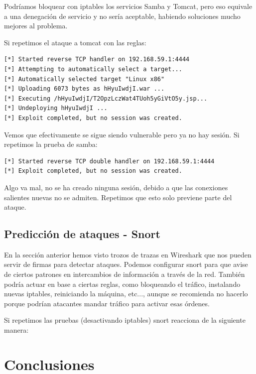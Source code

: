 \documentclass[a4paper,12pt]{scrartcl}
\begin{document}
\vspace{10pt}

Podríamos bloquear con iptables los servicios Samba y Tomcat, pero eso equivale a una denegación de servicio y no sería aceptable, habiendo soluciones mucho mejores al problema.

\vspace{10pt}

\noindent Si repetimos el ataque a tomcat con las reglas:

\begin{verbatim}
[*] Started reverse TCP handler on 192.168.59.1:4444 
[*] Attempting to automatically select a target...
[*] Automatically selected target "Linux x86"
[*] Uploading 6073 bytes as hHyuIwdjI.war ...
[*] Executing /hHyuIwdjI/T2OpzLczWat4TUoh5yGiVtO5y.jsp...
[*] Undeploying hHyuIwdjI ...
[*] Exploit completed, but no session was created.
\end{verbatim}

\noindent Vemos que efectivamente se sigue siendo vulnerable pero ya no hay sesión. Si repetimos la prueba de samba:

\begin{verbatim}
[*] Started reverse TCP double handler on 192.168.59.1:4444 
[*] Exploit completed, but no session was created.
\end{verbatim}

Algo va mal, no se ha creado ninguna sesión, debido a que las conexiones salientes nuevas no se admiten. Repetimos que esto solo previene parte del ataque.

\subsection{Predicción de ataques - Snort}



En la sección anterior hemos visto trozos de trazas en Wireshark que nos pueden servir de firmas para detectar ataques. Podemos configurar snort para que avise de ciertos patrones en intercambios de información a través de la red. También podría actuar en base a ciertas reglas, como bloqueando el tráfico, instalando nuevas iptables, reiniciando la máquina, etc..., aunque se recomienda no hacerlo porque podrían atacantes mandar tráfico para activar esas órdenes. 




Si repetimos las pruebas (desactivando iptables) snort reacciona de la siguiente manera:


\section{Conclusiones}




\end{document}
